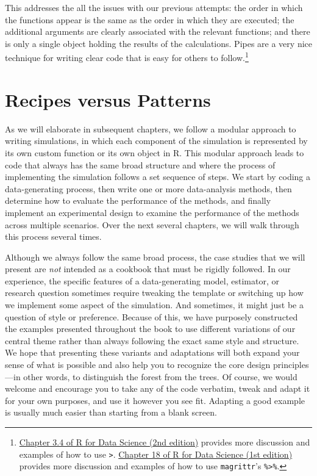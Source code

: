 \documentclass[
]{book}
\begin{document}
This addresses the all the issues with our previous attempts:
the order in which the functions appear is the same as the order in which they are executed;
the additional arguments are clearly associated with the relevant functions;
and there is only a single object holding the results of the calculations.
Pipes are a very nice technique for writing clear code that is easy for others to follow.\footnote{\href{https://r4ds.hadley.nz/data-transform.html\#sec-the-pipe}{Chapter 3.4 of R for Data Science (2nd edition)} provides more discussion and examples of how to use \texttt{\textbar{}\textgreater{}}. \href{https://r4ds.had.co.nz/pipes.html}{Chapter 18 of R for Data Science (1st edition)} provides more discussion and examples of how to use \texttt{magrittr}'s \texttt{\%\textgreater{}\%}.}

\section{Recipes versus Patterns}\label{recipes-versus-patterns}

As we will elaborate in subsequent chapters, we follow a modular approach to writing simulations, in which each component of the simulation is represented by its own custom function or its own object in R.
This modular approach leads to code that always has the same broad structure and where the process of implementing the simulation follows a set sequence of steps.
We start by coding a data-generating process, then write one or more data-analysis methods, then determine how to evaluate the performance of the methods, and finally implement an experimental design to examine the performance of the methods across multiple scenarios.
Over the next several chapters, we will walk through this process several times.

Although we always follow the same broad process, the case studies that we will present are \emph{not} intended as a cookbook that must be rigidly followed.
In our experience, the specific features of a data-generating model, estimator, or research question sometimes require tweaking the template or switching up how we implement some aspect of the simulation.
And sometimes, it might just be a question of style or preference.
Because of this, we have purposely constructed the examples presented throughout the book to use different variations of our central theme rather than always following the exact same style and structure.
We hope that presenting these variants and adaptations will both expand your sense of what is possible and also help you to recognize the core design principles---in other words, to distinguish the forest from the trees.
Of course, we would welcome and encourage you to take any of the code verbatim, tweak and adapt it for your own purposes, and use it however you see fit.
Adapting a good example is usually much easier than starting from a blank screen.
\end{document}
